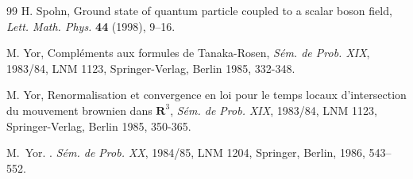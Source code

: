 \documentclass[12pt]{article}
\providecommand{\1}{\mathbb{1}}
\begin{document}
{\begin{thebibliography}{99}
H.  Spohn,
Ground state of quantum particle coupled to a scalar boson field,
{\it  Lett.   Math.   Phys.  } {\bf 44}   (1998),   9--16.


  M. Yor, Compl\'{e}ments aux formules de Tanaka-Rosen, 
\textit{S\'{e}m. de Prob. XIX}, 1983/84, LNM 1123, Springer-Verlag, Berlin 1985,
332-348.

  M. Yor, Renormalisation et convergence en loi pour le temps
locaux d'intersection du mouvement brownien dans $\mathbf{R}^{3}$, \textit{
S\'{e}m. de Prob. XIX}, 1983/84, LNM 1123, Springer-Verlag, Berlin 1985,
350-365.

M.~Yor.
.
\newblock \emph{S\'em. de Prob. XX}, 1984/85,  LNM 1204,  Springer, Berlin, 1986, 
543--552.


\end{thebibliography}
}
\end{document}
